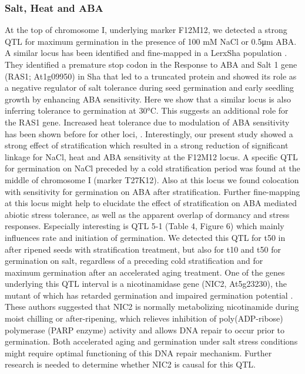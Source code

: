 \subsubsection{Salt, Heat and ABA}
At the top of chromosome I, underlying marker F12M12, we detected a strong QTL for maximum germination in 
the presence of 100 mM NaCl or 0.5μm ABA. A similar locus has been identified and fine-mapped in a 
LerxSha population \cite{Ren:2010}. They identified a premature stop codon in the Response to ABA and 
Salt 1 gene (RAS1; At1g09950) in Sha that led to a truncated protein and showed its role as a negative 
regulator of salt tolerance during seed germination and early seedling growth by enhancing ABA 
sensitivity. Here we show that a similar locus is also inferring tolerance to germination at 30°C. 
This suggests an additional role for the RAS1 gene. Increased heat tolerance due to modulation of 
ABA sensitivity has been shown before for other loci, \cite{Argyris:2008,Lee:2010}. 
Interestingly, our present study showed a strong effect of stratification which resulted in a strong 
reduction of significant linkage for NaCl, heat and ABA sensitivity at the F12M12 locus. A specific 
QTL for germination on NaCl preceded by a cold stratification period was found at the middle of 
chromosome I (marker T27K12). Also at this locus we found colocation with sensitivity for germination 
on ABA after stratification. Further fine-mapping at this locus might help to elucidate the effect 
of stratification on ABA mediated abiotic stress tolerance, as well as the apparent overlap of 
dormancy and stress responses. Especially interesting is QTL 5-1 (Table 4, Figure 6) which mainly 
influences rate and initiation of germination. We detected this QTL for t50 in after ripened seeds 
with stratification treatment, but also for t10 and t50 for germination on salt, regardless of a 
preceding cold stratification and for maximum germination after an accelerated aging treatment. 
One of the genes underlying this QTL interval is a nicotinamidase gene (NIC2, At5g23230), the mutant 
of which has retarded germination and impaired germination potential \cite{Hunt:2007}. These 
authors suggested that NIC2 is normally metabolizing nicotinamide during moist chilling or 
after-ripening, which relieves inhibition of poly(ADP-ribose) polymerase (PARP enzyme) activity and 
allows DNA repair to occur prior to germination. Both accelerated aging and germination under salt 
stress conditions might require optimal functioning of this DNA repair mechanism. Further research 
is needed to determine whether NIC2 is causal for this QTL.


